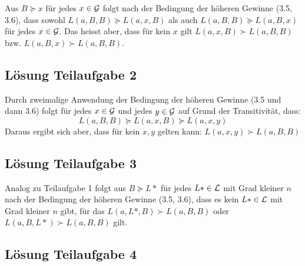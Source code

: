 \documentclass[10pt, a4paper, german]{article}
\numberwithin {equation}{section}
\begin{document}
Aus $B \succeq x$ für jedes $x \in {\cal G}$ folgt nach der Bedingung der höheren
Gewinne (3.5, 3.6), dass sowohl $L(a,B,B) \succeq L(a,x,B)$ als auch
$L(a,B,B) \succeq L(a,B,x)$ für jedes $x \in {\cal G}$. Das heisst aber, dass für
kein $x$ gilt $L(a,x,B) \succ L(a,B,B)$ bzw. $L(a,B,x) \succ
L(a,B,B)$.

\subsection{Lösung Teilaufgabe 2}

Durch zweimalige Anwendung der Bedingung der höheren Gewinne (3.5 und
dann 3.6) folgt für jedes $x \in {\cal G}$ und jedes $y \in {\cal
  G}$ auf Grund der Transitivität, dass:
\[L(a,B,B) \succeq L(a,x,B) \succeq L(a,x,y) \] Daraus ergibt sich
aber, dass für kein $x,y$ gelten kann: $L(a,x,y) \succ L(a,B,B)$


\subsection{Lösung Teilaufgabe 3}

Analog zu Teilaufgabe 1 folgt aus $B \succeq L*$ für jedes $L* \in
{\cal L}$ mit Grad kleiner $n$ nach der Bedingung der höheren Gewinne
(3.5, 3.6), dass es kein $L* \in {\cal L}$ mit Grad kleiner $n$ gibt,
für das $L(a,L*,B) \succ L(a,B,B)$ oder $L(a,B,L*) \succ L(a,B,B)$
gilt.

\subsection{Lösung Teilaufgabe 4}
\end{document}

